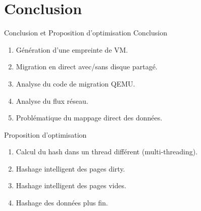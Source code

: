 \documentclass{libs/XJTLU_format}
\begin{document}
\section{Conclusion}
\begin{frame}{Conclusion et Proposition d'optimisation}
    Conclusion
    \begin{enumerate}
        \item Génération d'une empreinte de VM.
        \item Migration en direct avec/sans disque partagé.
        \item Analyse du code de migration QEMU.
        \item Analyse du flux réseau.
        \item Problématique du mappage direct des données.
    \end{enumerate}
    Proposition d'optimisation
    \begin{enumerate}
        \item Calcul du hash dans un thread différent (multi-threading).
        \item Hashage intelligent des pages dirty.
        \item Hashage intelligent des pages vides.
        \item Hashage des données plus fin.
    \end{enumerate}

\end{frame}
\end{document}
